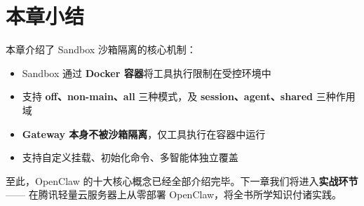 \section{本章小结}

本章介绍了 Sandbox 沙箱隔离的核心机制：

\begin{itemize}
  \item Sandbox 通过 \textbf{Docker 容器}将工具执行限制在受控环境中
  \item 支持 \textbf{off、non-main、all} 三种模式，及 \textbf{session、agent、shared} 三种作用域
  \item \textbf{Gateway 本身不被沙箱隔离}，仅工具执行在容器中运行
  \item 支持自定义挂载、初始化命令、多智能体独立覆盖
\end{itemize}

\noindent 至此，OpenClaw 的十大核心概念已经全部介绍完毕。下一章我们将进入\textbf{实战环节}——
在腾讯轻量云服务器上从零部署 OpenClaw，将全书所学知识付诸实践。
